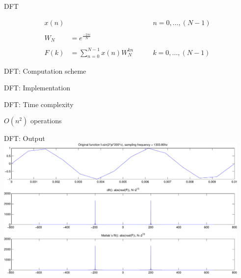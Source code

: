 
\newcommand{\sumnat}[1]{\sum_{n=0}^{#1-1}}
\newcommand{\sumn}{\sumnat{N}}
\newcommand{\sumnn}{\sumnat{N/2}}
\newcommand{\dft}{\sumn x(n) \wn{kn}}
\newcommand{\wn}[1]{W_N^{#1}}
\newcommand{\wnn}[1]{W_{N/2}^{#1}}
\newcommand{\fn}{F_N}
\newcommand{\fnn}{F_{N/2}}
\newcommand{\fnnodd}{F_{N/2}^{odd}}
\newcommand{\fnneven}{F_{N/2}^{even}}

\newcommand{\fnv}{\ve{F_N}}
\newcommand{\fnnv}{\ve{F_{N/2}}}
\newcommand{\fnnnv}{\ve{F_{N/2^2}}}

\newcommand{\xv}{\ve{x}}
\newcommand{\wvm}{\ve{\wn{}}}

\newcommand{\pmv}{\ve{P}}
\newcommand{\cmv}{\ve{C}}

\newcommand{\pmi}{\ve{P_i}}
\newcommand{\cmi}{\ve{C_i}}
\begin{myframe}{DFT}
\centering

\begin{align*}
x(n)&  &\qquad n=0,\dots, (N-1) \\ \\
W_N&= e^{ \frac{-2 \pi i}{ N} } \\ \\
F(k)&=\dft  &\qquad k=0,\dots,(N-1)
\end{align*}


\end{myframe}

\begin{myframe}{DFT: Computation scheme}
\centering


\end{myframe}


\begin{myframe}{DFT: Implementation}
\centering

\end{myframe}

\begin{myframe}{DFT: Time complexity}
\centering

\begin{block}{}
\centering
    $O(n^2)$ operations
\end{block}

\end{myframe}

\begin{myframe}{DFT: Output}
\includegraphics[height=200pt]{img/dft}
\end{myframe}

